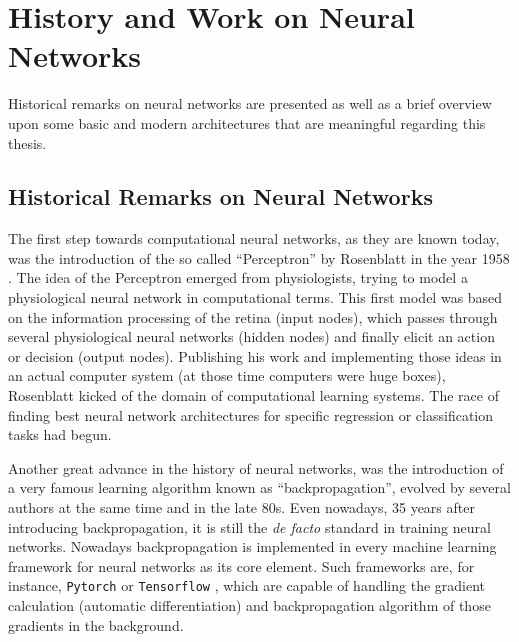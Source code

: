 
\section{History and Work on Neural Networks}\label{sec:prev_nn}
Historical remarks on neural networks are presented as well as a brief overview upon some basic and modern architectures that are meaningful regarding this thesis.



\subsection{Historical Remarks on Neural Networks}\label{sec:prev_nn_history}
The first step towards computational neural networks, as they are known today, was the introduction of the so called \enquote{Perceptron} by Rosenblatt in the year 1958 \cite{Rosenblatt1958}. 
The idea of the Perceptron emerged from physiologists, trying to model a physiological neural network in computational terms. 
This first model was based on the information processing of the retina (input nodes), which passes through several physiological neural networks (hidden nodes) and finally elicit an action or decision (output nodes).
Publishing his work and implementing those ideas in an actual computer system (at those time computers were huge boxes), Rosenblatt kicked of the domain of computational learning systems.
The race of finding best neural network architectures for specific regression or classification tasks had begun.

Another great advance in the history of neural networks, was the introduction of a very famous learning algorithm known as \enquote{backpropagation}, evolved by several authors at the same time \cite{LeCun1986} and \cite{Rumelhart1986} in the late 80s. 
Even nowadays, 35 years after introducing backpropagation, it is still the \emph{de facto} standard in training neural networks.
Nowadays backpropagation is implemented in every machine learning framework for neural networks as its core element.
Such frameworks are, for instance, \texttt{Pytorch} \cite{Pytorch} or \texttt{Tensorflow} \cite{Tensorflow}, which are capable of handling the gradient calculation (automatic differentiation) and backpropagation algorithm of those gradients in the background.

